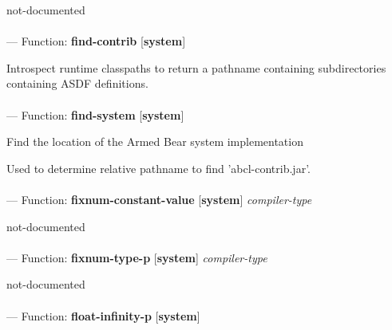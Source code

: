 \begin{adjustwidth}{5em}{5em}
not-documented
\end{adjustwidth}

\paragraph{}
\label{SYSTEM:FIND-CONTRIB}
--- Function: \textbf{find-contrib} [\textbf{system}] \textit{}

\begin{adjustwidth}{5em}{5em}
Introspect runtime classpaths to return a pathname containing
  subdirectories containing ASDF definitions.
\end{adjustwidth}

\paragraph{}
\label{SYSTEM:FIND-SYSTEM}
--- Function: \textbf{find-system} [\textbf{system}] \textit{}

\begin{adjustwidth}{5em}{5em}
Find the location of the Armed Bear system implementation

Used to determine relative pathname to find 'abcl-contrib.jar'.
\end{adjustwidth}

\paragraph{}
\label{SYSTEM:FIXNUM-CONSTANT-VALUE}
--- Function: \textbf{fixnum-constant-value} [\textbf{system}] \textit{compiler-type}

\begin{adjustwidth}{5em}{5em}
not-documented
\end{adjustwidth}

\paragraph{}
\label{SYSTEM:FIXNUM-TYPE-P}
--- Function: \textbf{fixnum-type-p} [\textbf{system}] \textit{compiler-type}

\begin{adjustwidth}{5em}{5em}
not-documented
\end{adjustwidth}

\paragraph{}
\label{SYSTEM:FLOAT-INFINITY-P}
--- Function: \textbf{float-infinity-p} [\textbf{system}] \textit{}


